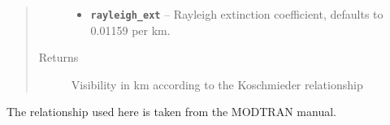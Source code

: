 \documentclass[a4paper,10pt,english]{sphinxmanual}
\begin{document}
\begin{fulllineitems}
\begin{quote}
\begin{description}
\begin{itemize}
\item {} 
\textbf{\texttt{rayleigh\_ext}} -- Rayleigh extinction coefficient, defaults to 0.01159 per km.

\end{itemize}

\item[{Returns}] \leavevmode
Visibility in km according to the Koschmieder relationship

\end{description}\end{quote}

The relationship used here is taken from the MODTRAN manual.

\end{fulllineitems}

\end{document}
